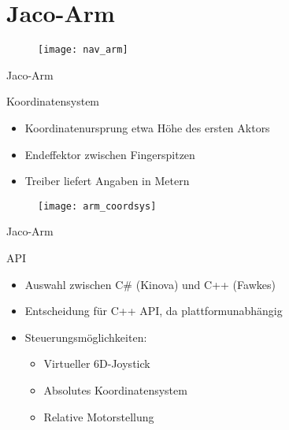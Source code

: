 
\section{Jaco-Arm}

\begin{frame}[b]
	\begin{figure}
		\texttt{[image: nav\_arm]}
	\end{figure}
	\vspace*{0.7cm}
\end{frame}

\begin{frame}[t]{Jaco-Arm}
	\begin{block}{Koordinatensystem}
		\begin{itemize}
			\item Koordinatenursprung etwa Höhe des ersten Aktors
			\item Endeffektor zwischen Fingerspitzen
			\item Treiber liefert Angaben in Metern
		\end{itemize}
		\begin{figure}
			\texttt{[image: arm\_coordsys]}
		\end{figure}
	\end{block}
\end{frame}

\begin{frame}[t]{Jaco-Arm}
	\begin{block}{API}
		\begin{itemize}
			\item Auswahl zwischen C\# (Kinova) und C++ (Fawkes)
			\item Entscheidung für C++ API, da plattformunabhängig
			\item Steuerungsmöglichkeiten:
				\begin{itemize}
					\item Virtueller 6D-Joystick
					\item Absolutes Koordinatensystem
					\item Relative Motorstellung
				\end{itemize}
		\end{itemize}
	\end{block}
\end{frame}


